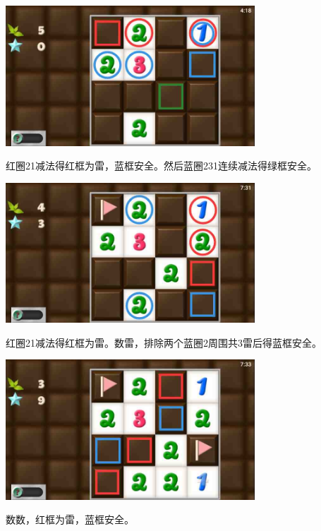 \subsection{} %
\begin{center}
    \includegraphics[width=0.7\textwidth]{puzzlelow/43-1.jpg}
\end{center}
红圈21减法得红框为雷，蓝框安全。然后蓝圈231连续减法得绿框安全。
\begin{center}
    \includegraphics[width=0.7\textwidth]{puzzlelow/43-2.jpg}
\end{center}
红圈21减法得红框为雷。数雷，排除两个蓝圈2周围共3雷后得蓝框安全。
\begin{center}
    \includegraphics[width=0.7\textwidth]{puzzlelow/43-3.jpg}
\end{center}
数数，红框为雷，蓝框安全。

